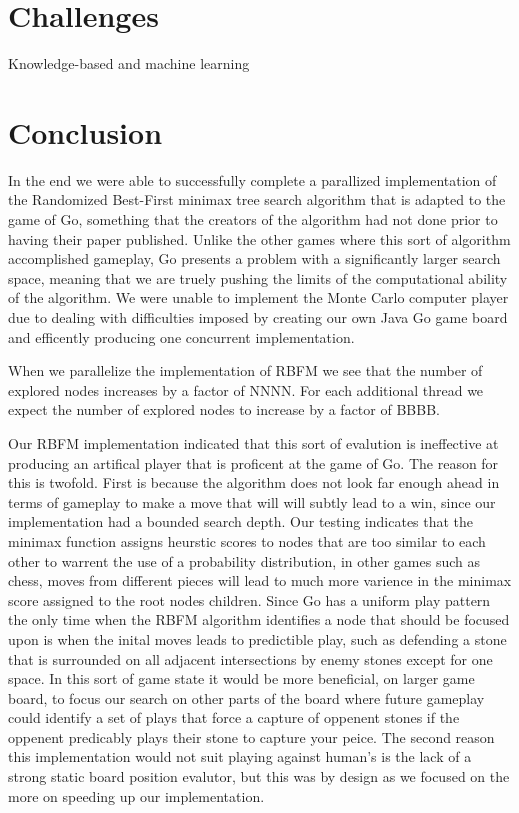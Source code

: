 \documentclass[conference]{IEEEtran}
\begin{document}
\section{Challenges}

Knowledge-based and machine learning

\section{Conclusion}
In the end we were able to successfully complete a parallized implementation of the Randomized Best-First minimax tree search algorithm that is adapted to the game of Go, something that the creators of the algorithm had not done prior to having their paper published. Unlike the other games where this sort of algorithm accomplished gameplay, Go presents a problem with a significantly larger search space, meaning that we are truely pushing the limits of the computational ability of the algorithm. We were unable to implement the Monte Carlo computer player due to dealing with difficulties imposed by creating our own Java Go game board and efficently producing one concurrent implementation.\par
When we parallelize the implementation of RBFM we see that the number of explored nodes increases by a factor of NNNN. For each additional thread we expect the number of explored nodes to increase by a factor of BBBB.\par
Our RBFM implementation indicated that this sort of evalution is ineffective at producing an artifical player that is proficent at the game of Go. The reason for this is twofold. First is because the algorithm does not look far enough ahead in terms of gameplay to make a move that will will subtly lead to a win, since our implementation had a bounded search depth. Our testing indicates that the minimax function assigns heurstic scores to nodes that are too similar to each other to warrent the use of a probability distribution, in other games such as chess, moves from different pieces will lead to much more varience in the minimax score assigned to the root nodes children. Since Go has a uniform play pattern the only time when the RBFM algorithm identifies a node that should be focused upon is when the inital moves leads to predictible play, such as defending a stone that is surrounded on all adjacent intersections by enemy stones except for one space. In this sort of game state it would be more beneficial, on larger game board, to focus our search on other parts of the board where future gameplay could identify a set of plays that force a capture of oppenent stones if the oppenent predicably plays their stone to capture your peice. The second reason this implementation would not suit playing against human's is the lack of a strong static board position evalutor, but this was by design as we focused on the more on speeding up our implementation.\par
\end{document}
